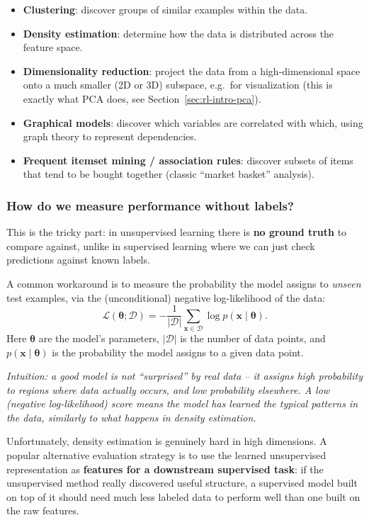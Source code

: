 \begin{itemize}
  \item \textbf{Clustering}: discover groups of similar examples within the data.
  \item \textbf{Density estimation}: determine how the data is distributed across the feature space.
  \item \textbf{Dimensionality reduction}: project the data from a high-dimensional space onto a much smaller (2D or 3D) subspace, e.g.\ for visualization (this is exactly what PCA does, see Section~\ref{sec:rl-intro-pca}).
  \item \textbf{Graphical models}: discover which variables are correlated with which, using graph theory to represent dependencies.
  \item \textbf{Frequent itemset mining / association rules}: discover subsets of items that tend to be bought together (classic ``market basket'' analysis).
\end{itemize}

\subsubsection{How do we measure performance without labels?}

This is the tricky part: in unsupervised learning there is \textbf{no ground truth} to compare against, unlike in supervised learning where we can just check predictions against known labels.

A common workaround is to measure the probability the model assigns to \textit{unseen} test examples, via the (unconditional) negative log-likelihood of the data:
\[
  \mathcal{L}(\boldsymbol{\theta}; \mathcal{D}) = -\frac{1}{|\mathcal{D}|} \sum_{\mathbf{x} \in \mathcal{D}} \log p(\mathbf{x} \mid \boldsymbol{\theta}).
\]
Here $\boldsymbol{\theta}$ are the model's parameters, $|\mathcal{D}|$ is the number of data points, and $p(\mathbf{x}\mid\boldsymbol{\theta})$ is the probability the model assigns to a given data point.

\textit{Intuition: a good model is not ``surprised'' by real data -- it assigns high probability to regions where data actually occurs, and low probability elsewhere. A low (negative log-likelihood) score means the model has learned the typical patterns in the data, similarly to what happens in density estimation.}

Unfortunately, density estimation is genuinely hard in high dimensions. A popular alternative evaluation strategy is to use the learned unsupervised representation as \textbf{features for a downstream supervised task}: if the unsupervised method really discovered useful structure, a supervised model built on top of it should need much less labeled data to perform well than one built on the raw features.

